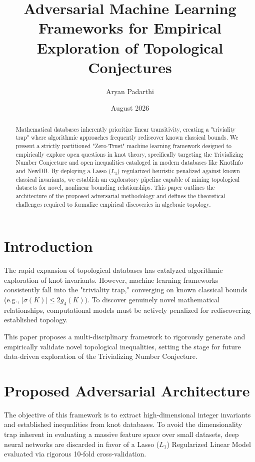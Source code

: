 \documentclass[12pt]{article}
\title{Adversarial Machine Learning Frameworks for Empirical Exploration of Topological Conjectures}
\author{Aryan Padarthi}
\date{August 2026}
\begin{document}
\maketitle

\begin{abstract}
Mathematical databases inherently prioritize linear transitivity, creating a "triviality trap" where algorithmic approaches frequently rediscover known classical bounds. We present a strictly partitioned "Zero-Trust" machine learning framework designed to empirically explore open questions in knot theory, specifically targeting the Trivializing Number Conjecture and open inequalities cataloged in modern databases like KnotInfo and NewDB. By deploying a Lasso ($L_1$) regularized heuristic penalized against known classical invariants, we establish an exploratory pipeline capable of mining topological datasets for novel, nonlinear bounding relationships. This paper outlines the architecture of the proposed adversarial methodology and defines the theoretical challenges required to formalize empirical discoveries in algebraic topology.
\end{abstract}

\section{Introduction}
\label{sec:intro}
The rapid expansion of topological databases has catalyzed algorithmic exploration of knot invariants. However, machine learning frameworks consistently fall into the "triviality trap," converging on known classical bounds (e.g., $|\sigma(K)| \leq 2g_4(K)$). To discover genuinely novel mathematical relationships, computational models must be actively penalized for rediscovering established topology.

This paper proposes a multi-disciplinary framework to rigorously generate and empirically validate novel topological inequalities, setting the stage for future data-driven exploration of the Trivializing Number Conjecture.

\section{Proposed Adversarial Architecture}
\label{sec:methodology}
The objective of this framework is to extract high-dimensional integer invariants and established inequalities from knot databases. To avoid the dimensionality trap inherent in evaluating a massive feature space over small datasets, deep neural networks are discarded in favor of a Lasso ($L_1$) Regularized Linear Model evaluated via rigorous 10-fold cross-validation. 
\end{document}
